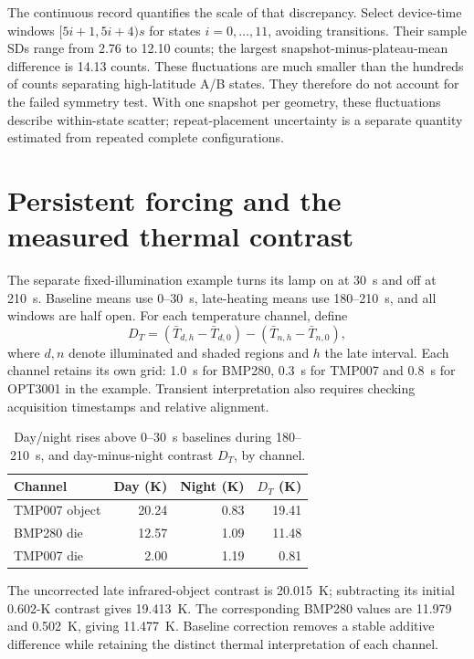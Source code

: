 The continuous record quantifies the scale of that discrepancy. Select device-time windows $[5i+1,5i+4)\unit{s}$ for states $i=0,\ldots,11$, avoiding transitions. Their sample SDs range from 2.76 to 12.10 counts; the largest snapshot-minus-plateau-mean difference is 14.13 counts. These fluctuations are much smaller than the hundreds of counts separating high-latitude A/B states. They therefore do not account for the failed symmetry test. With one snapshot per geometry, these fluctuations describe within-state scatter; repeat-placement uncertainty is a separate quantity estimated from repeated complete configurations.

\section{Persistent forcing and the measured thermal contrast}
The separate fixed-illumination example turns its lamp on at 30~s and off at 210~s. Baseline means use 0--30~s, late-heating means use 180--210~s, and all windows are half open. For each temperature channel, define
\begin{equation}
 D_T=(\bar T_{d,h}-\bar T_{d,0})
     -(\bar T_{n,h}-\bar T_{n,0}),
 \label{eq:tidal-locking-contrast}
\end{equation}
where $d,n$ denote illuminated and shaded regions and $h$ the late interval. Each channel retains its own grid: 1.0~s for BMP280, 0.3~s for TMP007 and 0.8~s for OPT3001 in the example. Transient interpretation also requires checking acquisition timestamps and relative alignment.

\begin{table}[t]
\caption{Day/night rises above 0--30~s baselines during 180--210~s, and day-minus-night contrast $D_T$, by channel.}
\label{tab:tidal-locking-thermal}
\centering\small
\begin{tabular}{@{}lrrr@{}}
\toprule
Channel & Day (K) & Night (K) & $D_T$ (K)\\
\midrule
TMP007 object & 20.24 & 0.83 & 19.41\\
BMP280 die & 12.57 & 1.09 & 11.48\\
TMP007 die & 2.00 & 1.19 & 0.81\\
\bottomrule
\end{tabular}
\end{table}

The uncorrected late infrared-object contrast is 20.015~K; subtracting its initial 0.602-K contrast gives 19.413~K. The corresponding BMP280 values are 11.979 and 0.502~K, giving 11.477~K. Baseline correction removes a stable additive difference while retaining the distinct thermal interpretation of each channel.

